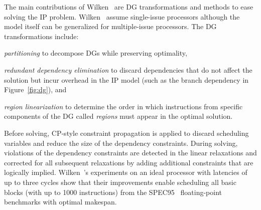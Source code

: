 \documentclass[acmsmall,authorversion,nonacm]{acmart}
\begin{document}
The main contributions of Wilken~\etal{} are DG transformations and
methods to ease solving the IP problem.
Wilken~\etal{} assume single-issue processors although the model
itself can be generalized for multiple-issue processors.
The DG transformations include:
\begin{inparaitem}[]
\item \emph{partitioning} to decompose DGs while preserving
  optimality,
\item \emph{redundant dependency elimination} to discard dependencies
  that do not affect the solution but incur overhead in the IP model
  (such as the branch dependency  in Figure~\ref{fig:dg}), and
\item \emph{region linearization} to determine the order in which
  instructions from specific components of the DG called
  \emph{regions} must appear in the optimal solution.
\end{inparaitem}
Before solving, CP-style constraint propagation is applied to discard
scheduling variables and reduce the size of the dependency
constraints.
During solving, violations of the dependency constraints are detected
in the linear relaxations and corrected for all subsequent relaxations
by adding additional constraints that are logically implied.
Wilken~\etal{}'s experiments on an ideal processor with latencies of
up to three cycles show that their improvements enable scheduling all
basic blocks (with up to 1000 instructions) from the SPEC95~\cite{CPU}
floating-point benchmarks with optimal makespan.
\end{document}
